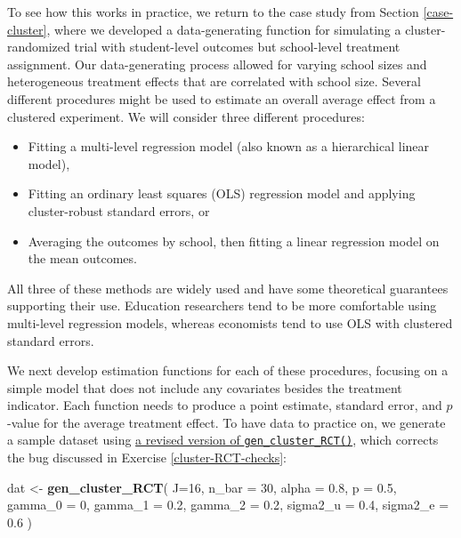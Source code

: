 \documentclass[
]{book}
\newenvironment{Shaded}{\begin{snugshade}}{\end{snugshade}}
\newcommand{\AttributeTok}[1]{\textcolor[rgb]{0.13,0.29,0.53}{#1}}
\newcommand{\DecValTok}[1]{\textcolor[rgb]{0.00,0.00,0.81}{#1}}
\newcommand{\FloatTok}[1]{\textcolor[rgb]{0.00,0.00,0.81}{#1}}
\newcommand{\FunctionTok}[1]{\textcolor[rgb]{0.13,0.29,0.53}{\textbf{#1}}}
\newcommand{\NormalTok}[1]{#1}
\newcommand{\OtherTok}[1]{\textcolor[rgb]{0.56,0.35,0.01}{#1}}
\providecommand{\tightlist}{%
  \setlength{\itemsep}{0pt}\setlength{\parskip}{0pt}}
\begin{document}
To see how this works in practice, we return to the case study from Section \ref{case-cluster}, where we developed a data-generating function for simulating a cluster-randomized trial with student-level outcomes but school-level treatment assignment.
Our data-generating process allowed for varying school sizes and heterogeneous treatment effects that are correlated with school size.
Several different procedures might be used to estimate an overall average effect from a clustered experiment. We will consider three different procedures:

\begin{itemize}
\tightlist
\item
  Fitting a multi-level regression model (also known as a hierarchical linear model),
\item
  Fitting an ordinary least squares (OLS) regression model and applying cluster-robust standard errors, or
\item
  Averaging the outcomes by school, then fitting a linear regression model on the mean outcomes.
\end{itemize}

All three of these methods are widely used and have some theoretical guarantees supporting their use.
Education researchers tend to be more comfortable using multi-level regression models, whereas economists tend to use OLS with clustered standard errors.

We next develop estimation functions for each of these procedures, focusing on a simple model that does not include any covariates besides the treatment indicator.
Each function needs to produce a point estimate, standard error, and \(p\)-value for the average treatment effect.
To have data to practice on, we generate a sample dataset using \href{/case_study_code/gen_cluster_RCT_rev.R}{a revised version of \texttt{gen\_cluster\_RCT()}}, which corrects the bug discussed in Exercise \ref{cluster-RCT-checks}:

\begin{Shaded}
\begin{Highlighting}[]
\NormalTok{dat }\OtherTok{\textless{}{-}} \FunctionTok{gen\_cluster\_RCT}\NormalTok{( }
  \AttributeTok{J=}\DecValTok{16}\NormalTok{, }\AttributeTok{n\_bar =} \DecValTok{30}\NormalTok{, }\AttributeTok{alpha =} \FloatTok{0.8}\NormalTok{, }\AttributeTok{p =} \FloatTok{0.5}\NormalTok{, }
  \AttributeTok{gamma\_0 =} \DecValTok{0}\NormalTok{, }\AttributeTok{gamma\_1 =} \FloatTok{0.2}\NormalTok{, }\AttributeTok{gamma\_2 =} \FloatTok{0.2}\NormalTok{,}
  \AttributeTok{sigma2\_u =} \FloatTok{0.4}\NormalTok{, }\AttributeTok{sigma2\_e =} \FloatTok{0.6}
\NormalTok{)}
\end{Highlighting}
\end{Shaded}
\end{document}
